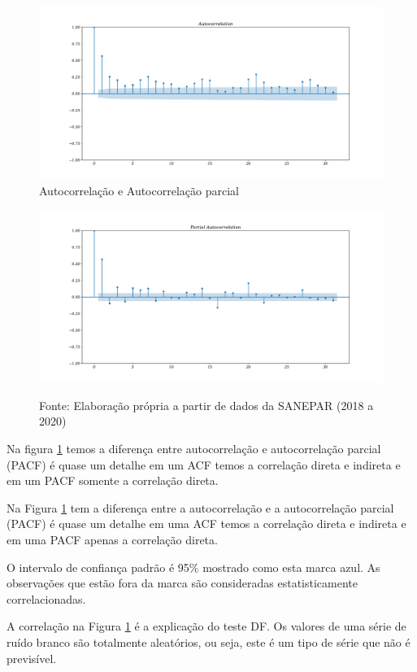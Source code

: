 \begin{figure}[H]
	\centering
	\caption{Autocorrelação e Autocorrelação parcial}
	\label{fig:acf}
	\includegraphics[width=0.9\linewidth]{Resultados/Figuras/acf} 
	
\end{figure}	
\begin{figure}[H]
	\centering
	\includegraphics[width=0.9\linewidth]{Resultados/Figuras/pacf}
	
	Fonte: Elaboração própria a partir de dados da SANEPAR (2018 a 2020)
\end{figure}

Na figura \ref{fig:acf} temos a diferença entre autocorrelação e autocorrelação parcial (PACF) é quase um detalhe em um ACF temos a correlação direta e indireta e em um PACF somente a correlação direta.  

Na Figura \ref{fig:acf} tem a diferença entre a autocorrelação e a autocorrelação parcial (PACF) é quase um detalhe em uma ACF temos a correlação direta e indireta e em uma PACF apenas a correlação direta. 

O intervalo de confiança padrão é 95\% mostrado como esta marca azul. As observações que estão fora da marca são consideradas estatisticamente correlacionadas.

A correlação na Figura \ref{fig:acf} é a explicação do teste DF. Os valores de uma série de ruído branco são totalmente aleatórios, ou seja, este é um tipo de série que não é previsível.

